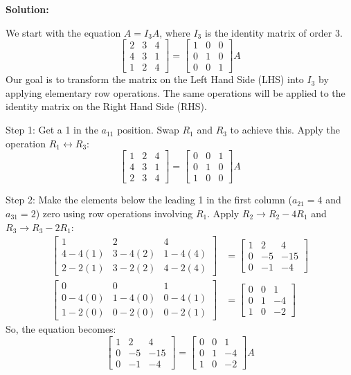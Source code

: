 \documentclass{article}
\begin{document}
\textbf{Solution:}

We start with the equation $A = I_3 A$, where $I_3$ is the identity matrix of order 3.
\[ \begin{bmatrix} 2 & 3 & 4 \\ 4 & 3 & 1 \\ 1 & 2 & 4 \end{bmatrix} = \begin{bmatrix} 1 & 0 & 0 \\ 0 & 1 & 0 \\ 0 & 0 & 1 \end{bmatrix} A \]
Our goal is to transform the matrix on the Left Hand Side (LHS) into $I_3$ by applying elementary row operations. The same operations will be applied to the identity matrix on the Right Hand Side (RHS).

Step 1: Get a 1 in the $a_{11}$ position. Swap $R_1$ and $R_3$ to achieve this.
Apply the operation $R_1 \leftrightarrow R_3$:
\[ \begin{bmatrix} 1 & 2 & 4 \\ 4 & 3 & 1 \\ 2 & 3 & 4 \end{bmatrix} = \begin{bmatrix} 0 & 0 & 1 \\ 0 & 1 & 0 \\ 1 & 0 & 0 \end{bmatrix} A \]

Step 2: Make the elements below the leading 1 in the first column ($a_{21}=4$ and $a_{31}=2$) zero using row operations involving $R_1$.
Apply $R_2 \to R_2 - 4R_1$ and $R_3 \to R_3 - 2R_1$:
\begin{align*} \begin{bmatrix} 1 & 2 & 4 \\ 4 - 4(1) & 3 - 4(2) & 1 - 4(4) \\ 2 - 2(1) & 3 - 2(2) & 4 - 2(4) \end{bmatrix} &= \begin{bmatrix} 1 & 2 & 4 \\ 0 & -5 & -15 \\ 0 & -1 & -4 \end{bmatrix} \\ \begin{bmatrix} 0 & 0 & 1 \\ 0 - 4(0) & 1 - 4(0) & 0 - 4(1) \\ 1 - 2(0) & 0 - 2(0) & 0 - 2(1) \end{bmatrix} &= \begin{bmatrix} 0 & 0 & 1 \\ 0 & 1 & -4 \\ 1 & 0 & -2 \end{bmatrix}\end{align*}
So, the equation becomes:
\[ \begin{bmatrix} 1 & 2 & 4 \\ 0 & -5 & -15 \\ 0 & -1 & -4 \end{bmatrix} = \begin{bmatrix} 0 & 0 & 1 \\ 0 & 1 & -4 \\ 1 & 0 & -2 \end{bmatrix} A \]
\end{document}
